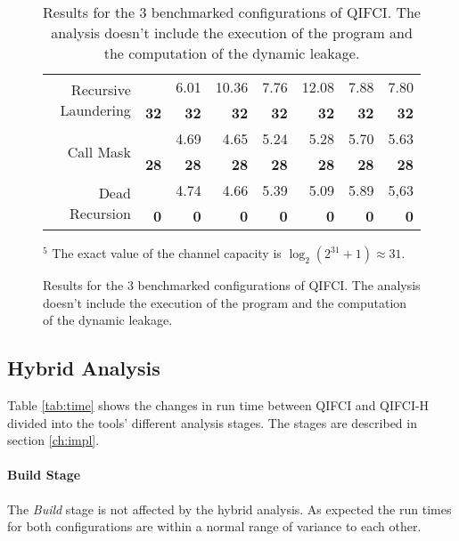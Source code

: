 \begin{figure}
\begin{table}[H]
\begin{tabular}{rr|rrrrrr}
\multirow{2}{*}{Recursive Laundering} &              & 6.01         & \multicolumn{1}{r|}{10.36}        & 7.76         & \multicolumn{1}{r|}{12.08}        & 7.88              & 7.80             \\
                                      & \textbf{32}  & \textbf{32}  & \multicolumn{1}{r|}{\textbf{32}}  & \textbf{32}  & \multicolumn{1}{r|}{\textbf{32}}  & \textbf{32}       & \textbf{32}      \\ \hline
\multirow{2}{*}{Call Mask}            &              & 4.69         & \multicolumn{1}{r|}{4.65}         & 5.24         & \multicolumn{1}{r|}{5.28}         & 5.70              & 5.63             \\
                                      & \textbf{28}  & \textbf{28}  & \multicolumn{1}{r|}{\textbf{28}}  & \textbf{28}  & \multicolumn{1}{r|}{\textbf{28}}  & \textbf{28}       & \textbf{28}      \\ \hline
\multirow{2}{*}{Dead Recursion}       &              & 4.74         & \multicolumn{1}{r|}{4.66}         & 5.39         & \multicolumn{1}{r|}{5.09}         & 5.89              & 5,63             \\
                                      & \textbf{0}   & \textbf{0}   & \multicolumn{1}{r|}{\textbf{0}}   & \textbf{0}   & \multicolumn{1}{r|}{\textbf{0}}   & \textbf{0}        & \textbf{0}       \\  
\end{tabular}
\caption{Results for the 3 benchmarked configurations of QIFCI. The analysis doesn't include the execution of the program and the computation of the dynamic leakage.}\label{tab:qifcicc}
\end{table}
{\footnotesize $^5$ The exact value of the channel capacity is $\log_2 (2^{31} + 1) \approx 31$.}
\end{figure}

\subsection{Hybrid Analysis}
Table \ref{tab:time} shows the changes in run time between QIFCI and QIFCI-H divided into the tools' different analysis stages. The stages are described in section \ref{ch:impl}.

\paragraph{Build Stage}
The \emph{Build} stage is not affected by the hybrid analysis. As expected the run times for both configurations are within a normal range of variance to each other.

